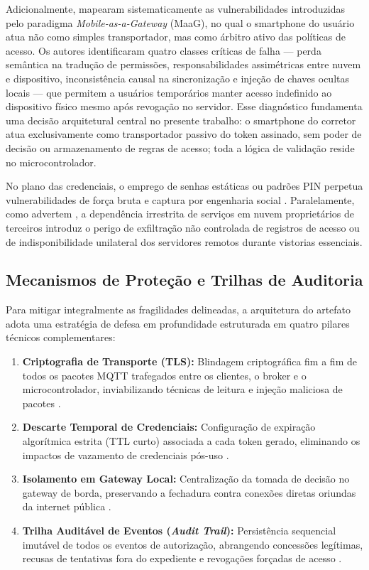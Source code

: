 Adicionalmente,  mapearam sistematicamente as vulnerabilidades introduzidas pelo paradigma \textit{Mobile-as-a-Gateway} (MaaG), no qual o smartphone do usuário atua não como simples transportador, mas como árbitro ativo das políticas de acesso. Os autores identificaram quatro classes críticas de falha --- perda semântica na tradução de permissões, responsabilidades assimétricas entre nuvem e dispositivo, inconsistência causal na sincronização e injeção de chaves ocultas locais --- que permitem a usuários temporários manter acesso indefinido ao dispositivo físico mesmo após revogação no servidor. Esse diagnóstico fundamenta uma decisão arquitetural central no presente trabalho: o smartphone do corretor atua exclusivamente como transportador passivo do token assinado, sem poder de decisão ou armazenamento de regras de acesso; toda a lógica de validação reside no microcontrolador.

No plano das credenciais, o emprego de senhas estáticas ou padrões PIN perpetua vulnerabilidades de força bruta e captura por engenharia social \cite{shauto2024}. Paralelamente, como advertem , a dependência irrestrita de serviços em nuvem proprietários de terceiros introduz o perigo de exfiltração não controlada de registros de acesso ou de indisponibilidade unilateral dos servidores remotos durante vistorias essenciais.

\subsection{Mecanismos de Proteção e Trilhas de Auditoria}
\label{subsec:mecanismos}

Para mitigar integralmente as fragilidades delineadas, a arquitetura do artefato adota uma estratégia de defesa em profundidade estruturada em quatro pilares técnicos complementares:

\begin{enumerate}
    \item \textbf{Criptografia de Transporte (TLS):} Blindagem criptográfica fim a fim de todos os pacotes MQTT trafegados entre os clientes, o broker e o microcontrolador, inviabilizando técnicas de leitura e injeção maliciosa de pacotes \cite{ameer2022, shauto2024}.
    \item \textbf{Descarte Temporal de Credenciais:} Configuração de expiração algorítmica estrita (TTL curto) associada a cada token gerado, eliminando os impactos de vazamento de credenciais pós-uso \cite{satanasaowapak2021}.
    \item \textbf{Isolamento em Gateway Local:} Centralização da tomada de decisão no gateway de borda, preservando a fechadura contra conexões diretas oriundas da internet pública \cite{vardakis2024, ameer2022}.
    \item \textbf{Trilha Auditável de Eventos (\textit{Audit Trail}):} Persistência sequencial imutável de todos os eventos de autorização, abrangendo concessões legítimas, recusas de tentativas fora do expediente e revogações forçadas de acesso \cite{shauto2024}.
\end{enumerate}

